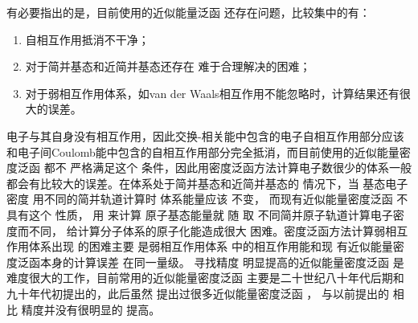 有必要指出的是，目前使用的{近似能量}泛函%
还存在问题，比较集中的有：
\begin{enumerate}
	\item 自相互作用抵消不干净；
	\item 对于简并基态和近简并基态还存在%
{难于合理解决的困难}；
	\item 对于弱相互作用体系，如van der Waals相互作用不能忽略时，{计算结果}还有很大的误差。%
\end{enumerate}
电子与{其}自身没有相互作用，因此交换-相关能中包含的电子自相互作用部分应该和电子间Coulomb能中包含的自相互作用部分完全抵消，而目前使用的{近似能量密度}泛函%
都不%
{严格满足}这个%
{条件}，因此{用}密度泛函方法计算电子数很少的体系一般都会有比较大的误差。{在体系处于}简并基态和近简并基态的%
{情况下}，当%
基态电子密度%
{用}不同的简并轨道{计算}时%
体系能量应该%
{不变}，%
{而现有近似能量密度}泛函%
不具有这个%
{性质}，%
用%
{来}计算%
原子基态能量就%
随%
取%
不同简并原子轨道{计算电子密度}而不同\cite{PRB43-6865_1991,CPL265-481_1997}，%
给计算分子体系的原子化能造成很大%
困难。密度泛函方法计算弱相互作用体系出现%
的{困难}主要%
是弱相互作用体系%
{中的相互作用}能和现%
{有近似能量密度泛函}本身的{计算}误差%
{在同一量级}。%
寻找精度%
明显提高的近似能量密度泛函%
是难度很大的工作，目前常用的{近似能量密度}泛函%
主要是二十世纪八十年代后期和九十年代初提出的，此后虽然%
{提出过很多}近似{能量密度}泛函%
，%
与以前提出的%
相比%
{精度并}没有很明显的%
{提高}。

